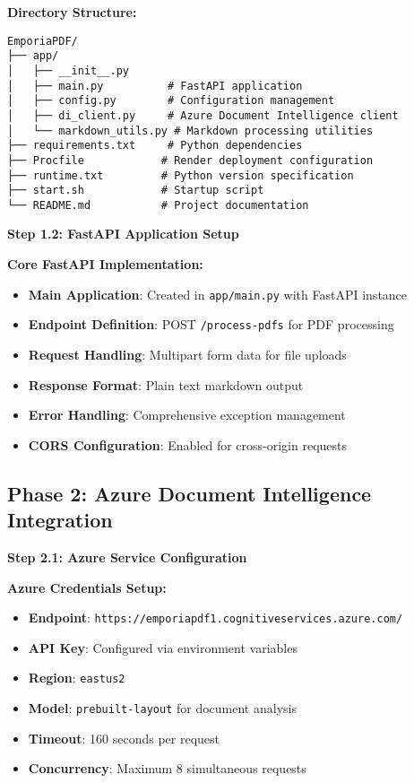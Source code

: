 \documentclass[11pt]{article}
\begin{document}
\begin{techbox}
\textbf{Directory Structure:}
\begin{verbatim}
EmporiaPDF/
├── app/
│   ├── __init__.py
│   ├── main.py          # FastAPI application
│   ├── config.py        # Configuration management
│   ├── di_client.py     # Azure Document Intelligence client
│   └── markdown_utils.py # Markdown processing utilities
├── requirements.txt     # Python dependencies
├── Procfile            # Render deployment configuration
├── runtime.txt         # Python version specification
├── start.sh            # Startup script
└── README.md           # Project documentation
\end{verbatim}
\end{techbox}

\begin{stepbox}
\textbf{Step 1.2: FastAPI Application Setup}
\end{stepbox}

\begin{techbox}
\textbf{Core FastAPI Implementation:}
\begin{itemize}
    \item \textbf{Main Application}: Created in \texttt{app/main.py} with FastAPI instance
    \item \textbf{Endpoint Definition}: POST \texttt{/process-pdfs} for PDF processing
    \item \textbf{Request Handling}: Multipart form data for file uploads
    \item \textbf{Response Format}: Plain text markdown output
    \item \textbf{Error Handling}: Comprehensive exception management
    \item \textbf{CORS Configuration}: Enabled for cross-origin requests
\end{itemize}
\end{techbox}

\subsection*{Phase 2: Azure Document Intelligence Integration}

\begin{stepbox}
\textbf{Step 2.1: Azure Service Configuration}
\end{stepbox}

\begin{techbox}
\textbf{Azure Credentials Setup:}
\begin{itemize}
    \item \textbf{Endpoint}: \texttt{https://emporiapdf1.cognitiveservices.azure.com/}
    \item \textbf{API Key}: Configured via environment variables
    \item \textbf{Region}: \texttt{eastus2}
    \item \textbf{Model}: \texttt{prebuilt-layout} for document analysis
    \item \textbf{Timeout}: 160 seconds per request
    \item \textbf{Concurrency}: Maximum 8 simultaneous requests
\end{itemize}
\end{techbox}
\end{document}

